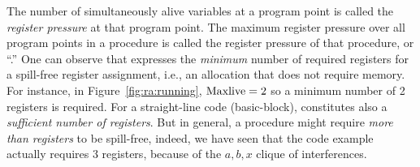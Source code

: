 {The number of simultaneously alive variables at a program point is called the \emph{register pressure} at that program point.
%
The maximum register pressure over all program points in a procedure is called the register pressure of that procedure, or ``\maxlive.'' 
One can observe that \maxlive expresses the \emph{minimum} number of required registers for a spill-free register assignment, i.e., an allocation that does not require memory.
For instance, in Figure~\ref{fig:ra:running}, $\mathrm{Maxlive} = 2$ so a minimum number of 2 registers is required.
For a straight-line code (basic-block), \maxlive constitutes also a \emph{sufficient number of registers}.
But in general, a procedure might require \emph{more than \maxlive registers} to be spill-free, indeed, we have seen that the code example actually requires 3 registers, because of the $a,b,x$ clique of interferences.




}
